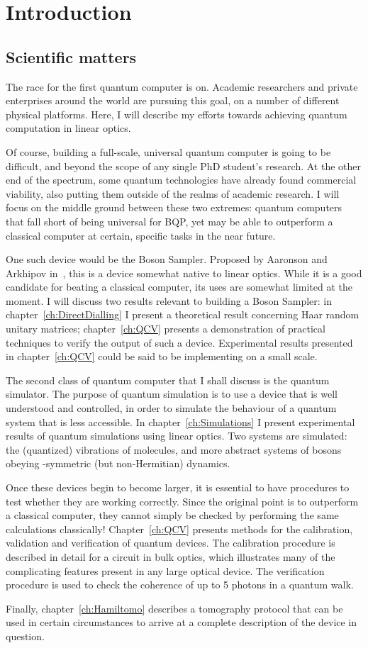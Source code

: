 \chapter{Introduction}
\label{ch:Introduction}
\section{Scientific matters}
\label{sec:science}
The race for the first quantum computer is on. Academic researchers and private
enterprises around the world are pursuing this goal, on a number of different
physical platforms. Here, I will describe my efforts towards achieving quantum
computation in linear optics.

Of course, building a full-scale, universal quantum computer is going to be
difficult, and beyond the scope of any single PhD student's research. At the
other end of the spectrum, some quantum technologies have already found
commercial viability, also putting them outside of the realms of academic
research. I will focus on the middle ground between these two extremes: quantum
computers that fall short of being universal for BQP, yet may be able to
outperform a classical computer at certain, specific tasks in the near future.

One such device would be the Boson Sampler. Proposed by Aaronson and Arkhipov
in~\cite{bosonsampling}, this is a device somewhat native to linear optics.
While it is
a good candidate for beating a classical computer, its uses are somewhat limited
at the moment. I will discuss two results relevant to building a Boson Sampler:
in chapter~\ref{ch:DirectDialling} I present a theoretical result concerning
Haar random unitary matrices; chapter~\ref{ch:QCV} presents a demonstration of
practical techniques to verify the output of such a device. Experimental results
presented in chapter~\ref{ch:QCV} could be said to be implementing
\bosonsampling{ }on a small scale.

The second class of quantum computer that I shall discuss is the quantum
simulator. The purpose of quantum simulation is to use a device that is well
understood and controlled, in order to simulate the behaviour of a quantum
system that is less accessible. In chapter~\ref{ch:Simulations} I present
experimental results of quantum simulations using linear optics. Two systems are
simulated: the (quantized) vibrations of molecules, and more abstract systems of
bosons obeying \pt-symmetric (but non-Hermitian) dynamics.

Once these devices begin to become larger, it is essential to have procedures to
test whether they are working correctly. Since the original point is to
outperform a classical computer, they cannot simply be checked by performing the
same calculations classically! Chapter~\ref{ch:QCV} presents methods for the
calibration, validation and verification of quantum devices. The calibration
procedure is described in detail for a circuit in bulk optics, which illustrates
many of the complicating features present in any large optical device. The
verification procedure is used to check the coherence  of up to 5 photons in a quantum walk.

Finally, chapter~\ref{ch:Hamiltomo} describes a tomography protocol that can be
used in certain circumstances to arrive at a complete description of the device
in question.
